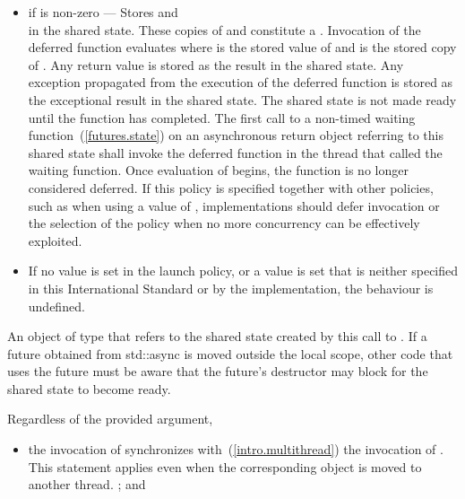 \begin{itemdescr}
\begin{itemize}
\item
if  is non-zero ---
Stores  and\\
in the shared state. These copies of  and  constitute
a . Invocation of the deferred function evaluates
 where  is the stored value of 
 and  is the stored copy of
.
Any return value is stored
as the result in the shared state.
Any exception propagated
from the execution
of the deferred function
is stored as the exceptional result
in the shared state.
The shared state is not
made ready until the function has completed. The first call to a
non-timed waiting function~(\ref{futures.state})
on an asynchronous return object referring to
this shared state shall invoke the
deferred function in the thread that called the waiting function.
Once evaluation of  begins, the function is no longer
considered deferred.
\enternote If this policy is specified together with other policies, such as when using a
 value of , implementations should defer
invocation or the selection of the policy when no more concurrency can be effectively
exploited. \exitnote

\item
If no value is set in the launch policy, or a value is set that is neither specified
in this International Standard or by the implementation, the behaviour is undefined.
\end{itemize}

\pnum
\returns An object of type
 that refers
to the shared state created by this call to .
\enternote If a future obtained from std::async is moved outside the local scope,
other code that uses the future must be aware that the future's destructor may
block for the shared state to become ready. \exitnote

\pnum
\sync
Regardless of the provided  argument,
\begin{itemize}
\item
the invocation of 
synchronizes with~(\ref{intro.multithread}) the invocation of . \enternote
This statement applies even when the corresponding  object is moved to
another thread. \exitnote; and


\end{itemize}
\end{itemdescr}
